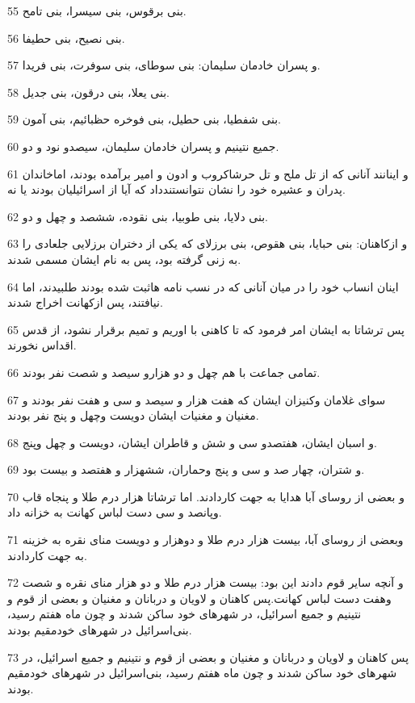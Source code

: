 \par 55 بنی برقوس، بنی سیسرا، بنی تامح.
\par 56 بنی نصیح، بنی حطیفا.
\par 57 و پسران خادمان سلیمان: بنی سوطای، بنی سوفرت، بنی فریدا.
\par 58 بنی یعلا، بنی درقون، بنی جدیل.
\par 59 بنی شفطیا، بنی حطیل، بنی فوخره حظبائیم، بنی آمون.
\par 60 جمیع نتینیم و پسران خادمان سلیمان، سیصدو نود و دو.
\par 61 و اینانند آنانی که از تل ملح و تل حرشاکروب و ادون و امیر برآمده بودند، اماخاندان پدران و عشیره خود را نشان نتوانستندداد که آیا از اسرائیلیان بودند یا نه.
\par 62 بنی دلایا، بنی طوبیا، بنی نقوده، ششصد و چهل و دو.
\par 63 و ازکاهنان: بنی حبایا، بنی هقوص، بنی برزلای که یکی از دختران برزلایی جلعادی را به زنی گرفته بود، پس به نام ایشان مسمی شدند.
\par 64 اینان انساب خود را در میان آنانی که در نسب نامه هاثبت شده بودند طلبیدند، اما نیافتند، پس ازکهانت اخراج شدند.
\par 65 پس ترشاتا به ایشان امر فرمود که تا کاهنی با اوریم و تمیم برقرار نشود، از قدس اقداس نخورند.
\par 66 تمامی جماعت با هم چهل و دو هزارو سیصد و شصت نفر بودند.
\par 67 سوای غلامان وکنیزان ایشان که هفت هزار و سیصد و سی و هفت نفر بودند و مغنیان و مغنیات ایشان دویست وچهل و پنج نفر بودند.
\par 68 و اسبان ایشان، هفتصدو سی و شش و قاطران ایشان، دویست و چهل وپنج.
\par 69 و شتران، چهار صد و سی و پنج وحماران، ششهزار و هفتصد و بیست بود.
\par 70 و بعضی از روسای آبا هدایا به جهت کاردادند. اما ترشاتا هزار درم طلا و پنجاه قاب وپانصد و سی دست لباس کهانت به خزانه داد.
\par 71 وبعضی از روسای آبا، بیست هزار درم طلا و دوهزار و دویست منای نقره به خزینه به جهت کاردادند.
\par 72 و آنچه سایر قوم دادند این بود: بیست هزار درم طلا و دو هزار منای نقره و شصت وهفت دست لباس کهانت.پس کاهنان و لاویان و دربانان و مغنیان و بعضی از قوم و نتینیم و جمیع اسرائیل، در شهرهای خود ساکن شدند و چون ماه هفتم رسید، بنی‌اسرائیل در شهرهای خودمقیم بودند.
\par 73 پس کاهنان و لاویان و دربانان و مغنیان و بعضی از قوم و نتینیم و جمیع اسرائیل، در شهرهای خود ساکن شدند و چون ماه هفتم رسید، بنی‌اسرائیل در شهرهای خودمقیم بودند.
 
